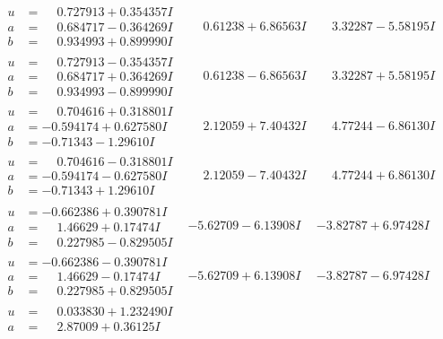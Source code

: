 \documentclass[1p]{elsarticle_modified}
\theoremstyle{definition}
\begin{document}
$$\begin{array}{c|c|c}
\begin{aligned}
u &= \phantom{-}0.727913 + 0.354357 I \\
a &= \phantom{-}0.684717 - 0.364269 I \\
b &= \phantom{-}0.934993 + 0.899990 I\end{aligned}
 & \phantom{-}0.61238 + 6.86563 I & \phantom{-}3.32287 - 5.58195 I \\ \hline\begin{aligned}
u &= \phantom{-}0.727913 - 0.354357 I \\
a &= \phantom{-}0.684717 + 0.364269 I \\
b &= \phantom{-}0.934993 - 0.899990 I\end{aligned}
 & \phantom{-}0.61238 - 6.86563 I & \phantom{-}3.32287 + 5.58195 I \\ \hline\begin{aligned}
u &= \phantom{-}0.704616 + 0.318801 I \\
a &= -0.594174 + 0.627580 I \\
b &= -0.71343 - 1.29610 I\end{aligned}
 & \phantom{-}2.12059 + 7.40432 I & \phantom{-}4.77244 - 6.86130 I \\ \hline\begin{aligned}
u &= \phantom{-}0.704616 - 0.318801 I \\
a &= -0.594174 - 0.627580 I \\
b &= -0.71343 + 1.29610 I\end{aligned}
 & \phantom{-}2.12059 - 7.40432 I & \phantom{-}4.77244 + 6.86130 I \\ \hline\begin{aligned}
u &= -0.662386 + 0.390781 I \\
a &= \phantom{-}1.46629 + 0.17474 I \\
b &= \phantom{-}0.227985 - 0.829505 I\end{aligned}
 & -5.62709 - 6.13908 I & -3.82787 + 6.97428 I \\ \hline\begin{aligned}
u &= -0.662386 - 0.390781 I \\
a &= \phantom{-}1.46629 - 0.17474 I \\
b &= \phantom{-}0.227985 + 0.829505 I\end{aligned}
 & -5.62709 + 6.13908 I & -3.82787 - 6.97428 I \\ \hline\begin{aligned}
u &= \phantom{-}0.033830 + 1.232490 I \\
a &= \phantom{-}2.87009 + 0.36125 I \\

\end{aligned}
\end{array}$$
\end{document}
